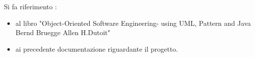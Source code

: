 Si fa riferimento :
\begin{itemize}
	\item al libro "Object-Oriented Software Engineering- using UML, Pattern and Java Bernd Bruegge Allen H.Dutoit"
	\item ai precedente documentazione riguardante il progetto.
\end{itemize}